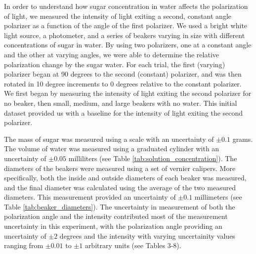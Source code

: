 
In order to understand how sugar concentration in water affects the polarization of light, we measured the intensity of light exiting a second, constant angle polarizer as a function of the angle of the first polarizer. We used a bright white light source, a photometer, and a series of beakers varying in size with different concentrations of sugar in water. By using two polarizers, one at a constant angle and the other at varying angles, we were able to determine the relative polarization change by the sugar water. For each trial, the first (varying) polarizer began at 90 degrees to the second (constant) polarizer, and was then rotated in 10 degree increments to 0 degrees relative to the constant polarizer. We first began by measuring the intensity of light exiting the second polarizer for no beaker, then small, medium, and large beakers with no water. This initial dataset provided us with a baseline for the intensity of light exiting the second polarizer.

The mass of sugar was measured using a scale with an uncertainty of $\pm 0.1$ grams. The volume of water was measured using a graduated cylinder with an uncertainty of $\pm 0.05$ milliliters (see Table \ref{tab:solution_concentration}). The diameters of the beakers were measured using a set of vernier calipers. More specifically, both the inside and outside diameters of each beaker was measured, and the final diameter was calculated using the average of the two measured diameters. This measurement provided an uncertainty of $\pm 0.1$ millimeters (see Table \ref{tab:beaker_diameters}). The uncertainty in measurement of both the polarization angle and the intensity contributed most of the measurement uncertainty in this experiment, with the polarization angle providing an uncertainty of $\pm 2$ degrees and the intensity with varying uncertainity values ranging from $\pm 0.01$ to $\pm 1$ arbitrary units (see Tables 3-8).

